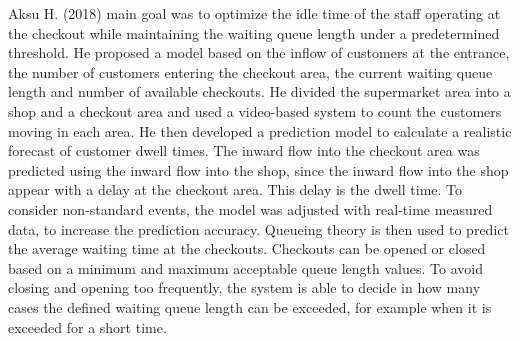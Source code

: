 Aksu H. (2018) \cite{aksu} main goal was to optimize the idle time of the staff operating at the checkout while maintaining the waiting queue length under a predetermined threshold. He proposed a model based on the inflow of customers at
the entrance, the number of customers entering the checkout area, the current waiting
queue length and number of available checkouts. He divided the supermarket area into a shop and a checkout area and used a video-based system to count the customers moving in each area. He then developed a prediction model to calculate a realistic forecast of customer dwell times. The inward flow into the checkout area was predicted using the inward flow into the shop, since the inward flow into the shop appear with a delay at the checkout area. This delay is the dwell time. To consider non-standard events, the model was adjusted with real-time measured data, to increase the prediction accuracy. Queueing theory is then used to predict the average waiting time at the checkouts. Checkouts can be opened or closed based on a minimum and maximum acceptable queue length values. To avoid closing and opening too frequently, the system is able to decide in how many cases the defined waiting queue length can be exceeded, for example when it is exceeded for a short time.


\clearpage